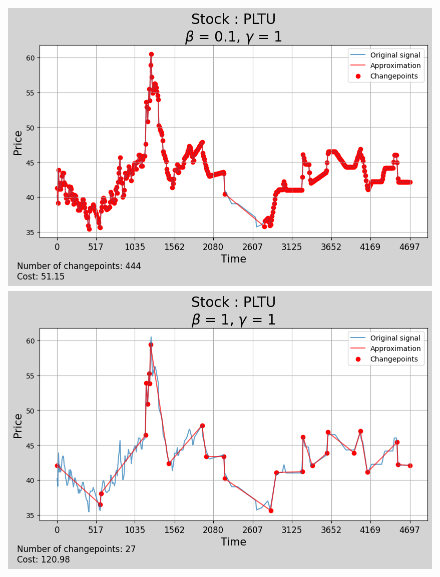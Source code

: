 \documentclass[11pt]{article}
\begin{document}
\begin{figure}
    \centering
    \begin{minipage}[t]{0.42\textwidth}
        \includegraphics[width=\textwidth]{figures/results/beta_analysis_scale_1_stock_PLTU/beta_0.1.png}
    \end{minipage}
    \begin{minipage}[t]{0.42\textwidth}
        \includegraphics[width=\textwidth]{figures/results/beta_analysis_scale_1_stock_PLTU/beta_1.png}
    \end{minipage}


\end{figure}
\end{document}
